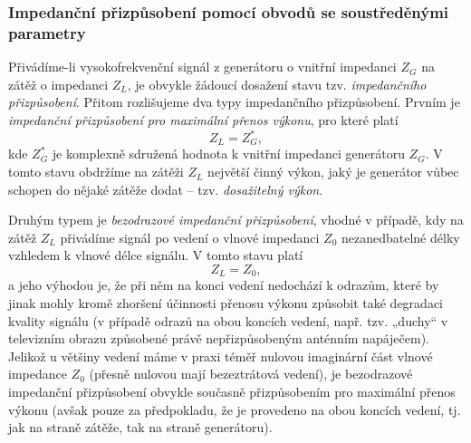       \subsubsection{Impedanční přizpůsobení pomocí obvodů se soustředěnými parametry}
        Přivádíme-li vysokofrekvenční signál z generátoru o vnitřní impedanci \(Z_G\) na zátěž o 
        impedanci \(Z_L\), je obvykle žádoucí dosažení stavu tzv. \emph{impedančního přizpůsobení}. 
        Přitom rozlišujeme dva typy impedančního přizpůsobení. Prvním je \emph{impedanční 
        přizpůsobení pro maximální přenos výkonu}, pro které platí
        \begin{equation}\label{RA:eq_smith05}
          Z_L = Z^*_G,
        \end{equation}  
        kde \(Z^*_G\) je komplexně sdružená hodnota k vnitřní impedanci generátoru \(Z_G\). V tomto 
        stavu obdržíme na zátěži \(Z_L\) největší činný výkon, jaký je generátor vůbec schopen do 
        nějaké zátěže dodat – tzv. \emph{dosažitelný výkon}.
  
        Druhým typem je \emph{bezodrazové impedanční přizpůsobení}, vhodné v případě, kdy na zátěž 
        \(Z_L\) přivádíme signál po vedení o vlnové impedanci \(Z_0\) nezanedbatelné délky vzhledem 
        k vlnové délce signálu. V tomto stavu platí
        \begin{equation}\label{RA:eq_smith06}
          Z_L = Z_0,
        \end{equation}  
        a jeho výhodou je, že při něm na konci vedení nedochází k odrazům, které by jinak mohly 
        kromě zhoršení účinnosti přenosu výkonu způsobit také degradaci kvality signálu (v případě 
        odrazů na obou koncích vedení, např. tzv. „duchy“ v televizním obrazu způsobené právě 
        nepřizpůsobeným anténním napáječem). Jelikož u většiny vedení máme v praxi téměř nulovou 
        imaginární část vlnové impedance \(Z_0\) (přesně nulovou mají bezeztrátová vedení), je 
        bezodrazové impedanční přizpůsobení obvykle současně přizpůsobením pro maximální přenos 
        výkonu (avšak pouze za předpokladu, že je provedeno na obou koncích vedení, tj. jak na 
        straně zátěže, tak na straně generátoru).
  
